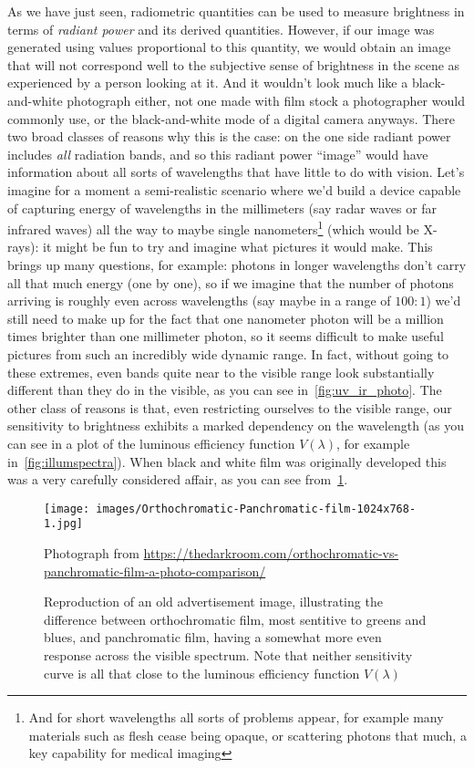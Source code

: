 As we have just seen, radiometric quantities can be used to measure brightness in 
terms of \emph{\gls{radiant power}} and its derived quantities.
However, if our image was generated using values proportional to this quantity,
we would obtain an image that will not correspond well to the subjective 
sense of brightness in the scene as experienced by a person looking at it. 
And it wouldn't look much like a black-and-white photograph either, not one made
with film stock a photographer would commonly use, or the black-and-white mode 
of a digital camera anyways.
There two broad classes of reasons why this is the case: 
on the one side radiant power includes \emph{all} radiation
bands, and so this radiant power ``image'' would have information about all sorts 
of wavelengths that have little to do with vision. 
Let's imagine for a moment a semi-realistic scenario where we'd build a device 
capable of capturing energy of wavelengths in the millimeters (say radar waves 
or far infrared waves) all the way to maybe single nanometers\footnote{
	And for short wavelengths all sorts of
	problems appear, for example many materials such as flesh cease being opaque, or 
	scattering photons that much, a key capability for medical imaging} 
(which would be X-rays): it might be fun to try and imagine what pictures it would make.
This brings up many questions, for example: photons in longer wavelengths don't carry
all that much energy (one by one), so if we imagine that the number of photons arriving
is roughly even across wavelengths (say maybe in a range of $100:1$) we'd still need to make
up for the fact that one nanometer photon will be a million times brighter than one millimeter
photon, so it seems difficult to make useful pictures from such an incredibly wide dynamic range.
In fact, without going to these extremes, even bands quite near to the visible range look 
substantially different than they do in the visible, as you can see in~\cref{fig:uv_ir_photo}. 
The other class of reasons is that, even restricting ourselves to the visible range, 
our sensitivity to brightness exhibits a marked dependency on the wavelength 
(as you can see in a plot of the luminous efficiency 
function $V(\lambda)$, for example in~\cref{fig:illumspectra}).
When black and white film was originally developed this was a very carefully considered
affair, as you can see from~\cref{fig:orthopanphoto}.

\begin{figure}
	{
		\hfill
		\texttt{[image: images/Orthochromatic-Panchromatic-film-1024x768-1.jpg]}
		\hfill
	}	
	
	\caption{\label{fig:orthopanphoto}
		Reproduction of an old advertisement image, illustrating the difference between
		orthochromatic film, most sentitive to greens and blues, and panchromatic film,
		having a somewhat more even response across the visible spectrum. 
		Note that neither sensitivity curve is all that close to the luminous efficiency
		function $V(\lambda)$}
	{\scriptsize\hfill
		Photograph from \url{https://thedarkroom.com/orthochromatic-vs-panchromatic-film-a-photo-comparison/}
	}
\end{figure}

